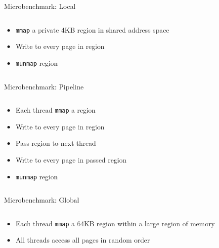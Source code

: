 \documentclass[aspectratio=169]{beamer}
\newcommand{\bi}{\begin{itemize}}
\newcommand{\ei}{\end{itemize}}
\begin{document}
\begin{frame}{Microbenchmark: Local}
  \begin{columns}[T]
    \begin{column}{0.5\textwidth}
      \bi
    \item \texttt{mmap} a private 4KB region in shared address space
      \pause
    \item Write to every page in region
      \pause
    \item \texttt{munmap} region
      \ei
    \end{column}
    \begin{column}{0.5\textwidth}
      \pause
      
    \end{column}
  \end{columns}
\end{frame}

\begin{frame}{Microbenchmark: Pipeline}
  \begin{columns}[T]
    \begin{column}{0.5\textwidth}
      \bi
    \item Each thread \texttt{mmap} a region
      \pause
    \item Write to every page in region
      \pause
    \item Pass region to next thread
      \pause
    \item Write to every page in passed region
      \pause
    \item \texttt{munmap} region
      \ei
    \end{column}
    \begin{column}{0.5\textwidth}
      \pause
      
    \end{column}
  \end{columns}
\end{frame}

\begin{frame}{Microbenchmark: Global}
  \begin{columns}[T]
    \begin{column}{0.5\textwidth}
      \bi
    \item Each thread \texttt{mmap} a 64KB region within a large region of memory
      \pause
    \item All threads access all pages in random order
      \ei
    \end{column}
    \begin{column}{0.5\textwidth}
      \pause
      
    \end{column}
  \end{columns}
\end{frame}
\end{document}
